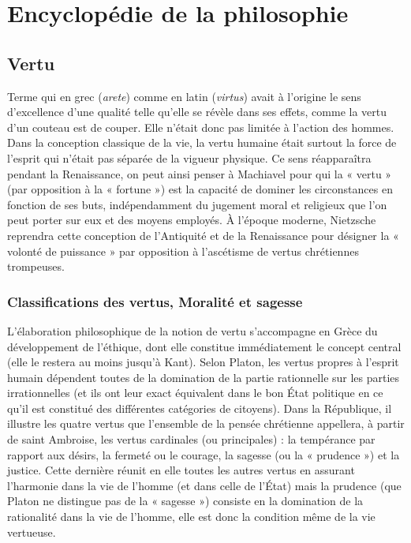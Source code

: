 
\section{Encyclopédie de la philosophie}

\subsection{Vertu}
Terme qui en grec ({\it arete}) comme en
latin ({\it virtus}) avait à l’origine le sens
d’excellence d’une qualité telle qu’elle se
révèle dans ses effets, comme la vertu
d’un couteau est de couper. Elle n’était
donc pas limitée à l’action des hommes.
Dans la conception classique de la vie, la
vertu humaine était surtout la force de
l'esprit qui n'était pas séparée de la
vigueur physique. Ce sens réapparaîtra
pendant la Renaissance, on peut ainsi
penser à Machiavel pour qui la « vertu »
(par opposition à la « fortune ») est la
capacité de dominer les circonstances en
fonction de ses buts, indépendamment du
jugement moral et religieux que l’on peut
porter sur eux et des moyens employés. À
l'époque moderne, Nietzsche reprendra
cette conception de l'Antiquité et de la
Renaissance pour désigner la « volonté de
puissance » par opposition à l’ascétisme
de vertus chrétiennes trompeuses.

\subsubsection{Classifications des vertus,
Moralité et sagesse}


L'élaboration philosophique de la
notion de vertu s'accompagne en Grèce
du développement de l’éthique, dont elle
constitue immédiatement le concept central
(elle le restera au moins jusqu’à
Kant). Selon Platon, les vertus propres à
l'esprit humain dépendent toutes de la
domination de la partie rationnelle sur les
parties irrationnelles (et ils ont leur exact
équivalent dans le bon État politique en
ce qu’il est constitué des différentes catégories
de citoyens). Dans la République,
il illustre les quatre vertus que l’ensemble
de la pensée chrétienne appellera, à partir
de saint Ambroise, les vertus cardinales
(ou principales) : la tempérance par rapport
aux désirs, la fermeté ou le courage,
la sagesse (ou la « prudence ») et la justice.
Cette dernière réunit en elle toutes
les autres vertus en assurant l'harmonie
dans la vie de l’homme (et dans celle de
l'État) mais la prudence (que Platon ne
distingue pas de la « sagesse ») consiste en
la domination de la rationalité dans la vie
de l’homme, elle est donc la condition
même de la vie vertueuse.

